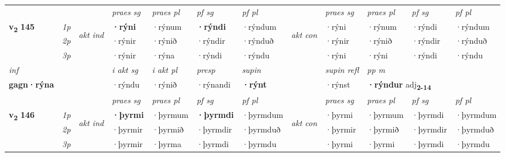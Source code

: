 \begin{longtable}[l]{X>{\footnotesize\itshape}llXXXXlXXXX}
 & &   & \textit{praes sg}  & \textit{praes pl}    & \textit{ pf sg} & \textit{pf pl} & & \textit{praes sg}  & \textit{praes pl}    & \textit{pf sg} & \textit{pf pl }  \\ \cmidrule{4-7} \cmidrule{9-12}
 \multirow{2}{*}{{{\textbf{v{\textsubscript{2}}} \Large{\textbf{145}}}}}  & 1p & \multirow{3}{*}{\begin{turn}{90}\textit{akt ind}\end{turn}} & \textbf{·rýni} & ·rýnum & \textbf{·rýndi} & ·rýndum & \multirow{3}{*}{\begin{turn}{90}\textit{akt con}\end{turn}} &·rýni & ·rýnum & ·rýndi & ·rýndum\\*
 & 2p &  &  ·rýnir  & ·rýnið & ·rýndir & ·rýnduð & & ·rýnir & ·rýnið & ·rýndir & ·rýnduð \\*
 & 3p &  & ·rýnir & ·rýna & ·rýndi & ·rýndu & & ·rýni & ·rýni& ·rýndi & ·rýndu \\*
\cmidrule{4-7} \cmidrule{9-12}

   {\textit{inf}} & &  & \textit{i akt sg} & \textit{i akt pl}   & \textit{presp} & \textit{supin} && \textit{supin refl} & \textit{pp m} \\*
  {\textbf{gagn\allowbreak ·rýna}} & && ·rýndu  & ·rýnið   & ·rýnandi &  \textbf{·rýnt} && ·rýnst & \multicolumn{2}{l}{\textbf{·rýndur} adj\textbf{\textsubscript{2-14}}} \\*

\midrule

 & &   & \textit{praes sg}  & \textit{praes pl}    & \textit{ pf sg} & \textit{pf pl} & & \textit{praes sg}  & \textit{praes pl}    & \textit{pf sg} & \textit{pf pl }  \\ \cmidrule{4-7} \cmidrule{9-12}
 \multirow{2}{*}{{{\textbf{v{\textsubscript{2}}} \Large{\textbf{146}}}}}  & 1p & \multirow{3}{*}{\begin{turn}{90}\textit{akt ind}\end{turn}} & \textbf{·þyrmi} & ·þyrmum & \textbf{·þyrmdi} & ·þyrmdum & \multirow{3}{*}{\begin{turn}{90}\textit{akt con}\end{turn}} &·þyrmi & ·þyrmum & ·þyrmdi & ·þyrmdum\\*
 & 2p &  &  ·þyrmir  & ·þyrmið & ·þyrmdir & ·þyrmduð & & ·þyrmir & ·þyrmið & ·þyrmdir & ·þyrmduð \\*
 & 3p &  & ·þyrmir & ·þyrma & ·þyrmdi & ·þyrmdu & & ·þyrmi & ·þyrmi& ·þyrmdi & ·þyrmdu \\*
\cmidrule{4-7} \cmidrule{9-12}


\end{longtable}
